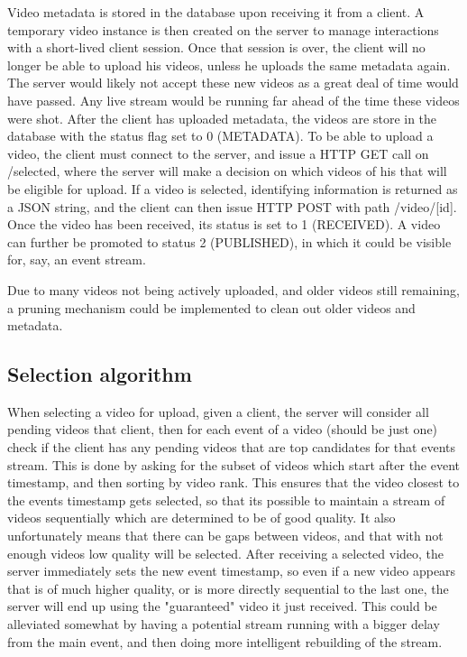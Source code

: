 \documentclass[conference]{IEEEtran}
\begin{document}
Video metadata is stored in the database upon receiving it from a client. A temporary video instance
is then created on the server to manage interactions with a short-lived client session. Once that session
is over, the client will no longer be able to upload his videos, unless he uploads the same metadata again.
The server would likely not accept these new videos as a great deal of time would have passed. Any live stream
would be running far ahead of the time these videos were shot. After the client has uploaded metadata, the
videos are store in the database with the status flag set to 0 (METADATA). To be able to upload a video,
the client must connect to the server, and issue a HTTP GET call on /selected, where the server will make
a decision on which videos of his that will be eligible for upload. If a video is selected, identifying
information is returned as a JSON string, and the client can then issue HTTP POST with path /video/[id].
Once the video has been received, its status is set to 1 (RECEIVED). A video can further be promoted to
status 2 (PUBLISHED), in which it could be visible for, say, an event stream.

Due to many videos not being actively uploaded, and older videos still remaining, a pruning mechanism could
be implemented to clean out older videos and metadata.

\subsection{Selection algorithm}

When selecting a video for upload, given a client, the server will consider all pending videos that client,
then for each event of a video (should be just one) check if the client has any pending videos that
are top candidates for that events stream. This is done by asking for the subset of videos which start after
the event timestamp, and then sorting by video rank. This ensures that the video closest to the events
timestamp gets selected, so that its possible to maintain a stream of videos sequentially which are determined
to be of good quality. It also unfortunately means that there can be gaps between videos, and that with not
enough videos low quality will be selected. After receiving a selected video, the server immediately sets the
new event timestamp, so even if a new video appears that is of much higher quality, or is more directly
sequential to the last one, the server will end up using the "guaranteed" video it just received. This could
be alleviated somewhat by having a potential stream running with a bigger delay from the main event, and then
doing more intelligent rebuilding of the stream.
\end{document}

